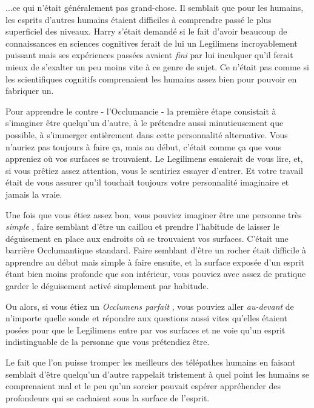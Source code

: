 ...ce qui n'était généralement pas grand-chose. Il semblait que pour les humains, les esprits d'autres humains étaient difficiles à comprendre passé le plus superficiel des niveaux. Harry s'était demandé si le fait d'avoir beaucoup de connaissances en sciences cognitives ferait de lui un Legilimens incroyablement puissant mais ses expériences passées avaient \emph{fini}  par lui inculquer qu'il ferait mieux de s'exalter un peu moins vite à ce genre de sujet. Ce n'était pas comme si les scientifiques cognitifs comprenaient les humains assez bien pour pouvoir en fabriquer un.

Pour apprendre le contre - l'Occlumancie - la première étape consistait à s'imaginer être quelqu'un d'autre, à le prétendre aussi minutieusement que possible, à s'immerger entièrement dans cette personnalité alternative. Vous n'auriez pas toujours à faire ça, mais au début, c'était comme ça que vous appreniez où vos surfaces se trouvaient. Le Legilimens essaierait de vous lire, et, si vous prêtiez assez attention, vous le sentiriez essayer d'entrer. Et votre travail était de vous assurer qu'il touchait toujours votre personnalité imaginaire et jamais la vraie.

Une fois que vous étiez assez bon, vous pouviez imaginer être une personne très \emph{simple} , faire semblant d'être un caillou et prendre l'habitude de laisser le déguisement en place aux endroits où se trouvaient vos surfaces. C'était une barrière Occlumantique standard. Faire semblant d'être un rocher était difficile à apprendre au début mais simple à faire ensuite, et la surface exposée d'un esprit étant bien moins profonde que son intérieur, vous pouviez avec assez de pratique garder le déguisement activé simplement par habitude.

Ou alors, si vous étiez un \emph{Occlumens parfait} , vous pouviez aller \emph{au-devant}  de n'importe quelle sonde et répondre aux questions aussi vites qu'elles étaient posées pour que le Legilimens entre par vos surfaces et ne voie qu'un esprit indistinguable de la personne que vous prétendiez être.

Le fait que l'on puisse tromper les meilleurs des télépathes humains en faisant semblait d'être quelqu'un d'autre rappelait tristement à quel point les humains se comprenaient mal et le peu qu'un sorcier pouvait espérer appréhender des profondeurs qui se cachaient sous la surface de l'esprit.

